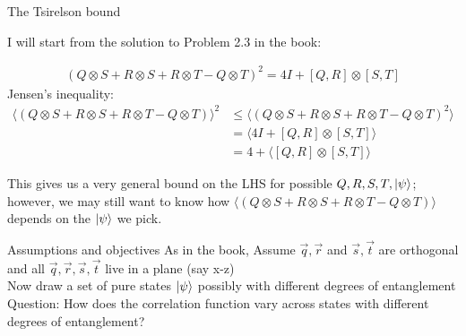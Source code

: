 \documentclass[aspectratio=1610]{beamer}					%
\begin{document}
\begin{frame}{The Tsirelson bound}

I will start from the solution to Problem 2.3 in the book:

\begin{align*}
(Q\otimes S + R\otimes S  + R\otimes T  - Q\otimes T)^{2} = 4I + [Q,R]\otimes [S,T]
\end{align*}
Jensen's inequality:
\begin{align*}
\langle(Q\otimes S + R\otimes S  + R\otimes T  - Q\otimes T)\rangle^{2} &\leq \langle(Q\otimes S + R\otimes S  + R\otimes T  - Q\otimes T)^{2}\rangle \\
&= \langle 4I + [Q,R]\otimes [S,T]\rangle \\
&= 4 + \langle [Q,R]\otimes [S,T]\rangle
\end{align*}

This gives us a very general bound on the LHS for possible $Q,R,S,T,\ket{\psi}$; however, we may still want to know how $\langle(Q\otimes S + R\otimes S  + R\otimes T  - Q\otimes T)\rangle$ depends on the $\ket{\psi}$ we pick.

\end{frame}

\begin{frame}{Assumptions and objectives}
As in the book, 
Assume $\vec{q},\vec{r}$ and $\vec{s},\vec{t}$ are orthogonal and all $\vec{q},\vec{r},\vec{s},\vec{t}$ live in a plane (say x-z)\\
\vspace{0.2in}
Now draw a set of pure states $\ket{\psi}$ possibly with different degrees of entanglement\\
\vspace{0.2in}
Question:  How does the correlation function vary across states with different degrees of entanglement?
\end{frame}
\end{document}
